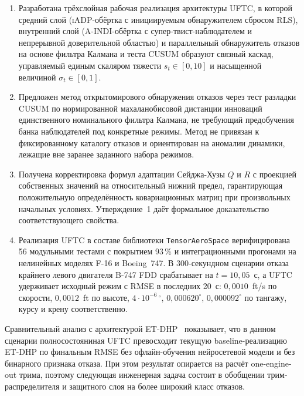 \documentclass[a4paper,14pt]{extarticle}
\newcommand{\UFTC}{\textsc{UFTC}}
\newcommand{\ET}{\textsc{ET-DHP}}
\newcommand{\IADP}{\textsc{iADP}}
\newcommand{\AINDI}{\textsc{A-INDI}}
\newcommand{\FDD}{\textsc{FDD}}
\newcommand{\CUSUM}{\textsc{CUSUM}}
\newcommand{\RLS}{\textsc{RLS}}
\newcommand{\degr}{^{\circ}}
\begin{document}
\begin{enumerate}
\item Разработана трёхслойная рабочая реализация архитектуры \UFTC{}, в которой средний слой (\IADP{}-обёртка с инициируемым обнаружителем сбросом \RLS{}), внутренний слой (\AINDI{}-обёртка с супер-твист-наблюдателем и непрерывной доверительной областью) и параллельный обнаружитель отказов на основе фильтра Калмана и теста \CUSUM{} образуют связный каскад, управляемый единым скаляром тяжести $s_t\in[0,10]$ и насыщенной величиной $\sigma_t\in[0,1]$.

\item Предложен метод открытомирового обнаружения отказов через тест разладки \CUSUM{} по нормированной махаланобисовой дистанции инноваций единственного номинального фильтра Калмана, не требующий предобучения банка наблюдателей под конкретные режимы. Метод не привязан к фиксированному каталогу отказов и ориентирован на аномалии динамики, лежащие вне заранее заданного набора режимов.

\item Получена корректировка формул адаптации Сейджа-Хузы $Q$ и $R$ с проекцией собственных значений на относительный нижний предел, гарантирующая положительную определённость ковариационных матриц при произвольных начальных условиях. Утверждение~1 даёт формальное доказательство соответствующего свойства.

\item Реализация \UFTC{} в составе библиотеки \texttt{TensorAeroSpace} верифицирована 56 модульными тестами с покрытием 93\,\% и интеграционными прогонами на нелинейных моделях F-16 и Boeing~747. В 300-секундном сценарии отказа крайнего левого двигателя B-747 \FDD{} срабатывает на $t=10{,}05$~с, а \UFTC{} удерживает исходный режим с RMSE в последних 20~с: $0{,}0010$~ft/s по скорости, $0{,}0012$~ft по высоте, $4\cdot10^{-6}\,\degr$, $0{,}000620\degr$, $0{,}000092\degr$ по тангажу, курсу и крену соответственно.
\end{enumerate}

Сравнительный анализ с архитектурой \ET{}~\cite{mazaev2026etdhp} показывает, что в данном сценарии полносостояниная \UFTC{} превосходит текущую baseline-реализацию \ET{} по финальным RMSE без офлайн-обучения нейросетевой модели и без бинарного признака отказа. При этом результат опирается на расчёт one-engine-out трима, поэтому следующая инженерная задача состоит в обобщении трим-распределителя и защитного слоя на более широкий класс отказов.
\end{document}
